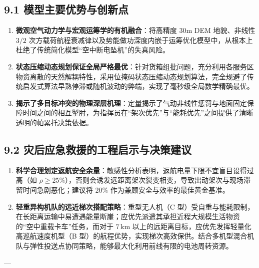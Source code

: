 \documentclass[12pt,a4paper,UTF8]{ctexart}
\begin{document}
\subsection{9.1 模型主要优势与创新点}
\begin{enumerate}[leftmargin=*]
    \item \textbf{微观空气动力学与宏观运筹学的有机融合}：将高精度 30m DEM 地貌、非线性 $3/2$ 次方载荷航程衰减律以及势能做功深度内嵌于运筹优化模型中，从根本上杜绝了传统简化模型“空中断电坠机”的失真风险。
    \item \textbf{状态压缩动态规划保证全局严格最优}：针对货箱组批问题，充分利用各服务区物资离散的天然解耦特性，采用位掩码状态压缩动态规划算法，完全规避了传统启发式算法早熟停滞或随机波动的弊端，实现了毫秒级全局数学精确最优。
    \item \textbf{揭示了多目标冲突的物理深层机理}：定量揭示了气动非线性惩罚与地面固定保障时间之间的相互掣肘，为指挥员在“架次优先”与“能耗优先”之间提供了清晰透明的帕累托决策依据。
\end{enumerate}

\subsection{9.2 灾后应急救援的工程启示与决策建议}
\begin{enumerate}[leftmargin=*]
    \item \textbf{科学合理划定返航安全余量}：敏感性分析表明，返航电量下限不宜盲目设得过高（如 $\rho \ge 25\%$），否则会诱发远距离架次裂变相变，导致出动架次与现场滞留时间急剧恶化；建议将 $20\%$ 作为兼顾安全与效率的最佳黄金基准。
    \item \textbf{轻重异构机队的远近梯次搭配策略}：重型无人机（C 型）受自重与能耗限制，在长距离运输中易遭遇能量断崖；应优先派遣其承担近程大规模生活物资的“空中重载卡车”任务，而对于 $7\,\text{km}$ 以上的远距离目标，应优先发挥轻量化高巡航速度机型（B 型）的航程优势，实现梯次高效保供。结合多机型混合机队与弹性投送点协同策略\cite{moshref2020}，能够最大化利用前线有限的电池周转资源。
\end{enumerate}

---
\end{document}
